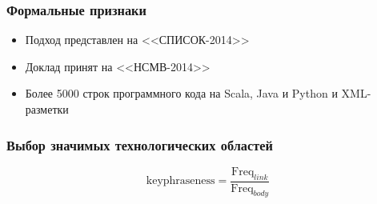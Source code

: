 \documentclass{beamer}
\begin{document}
\begin{frame}\frametitle{Формальные признаки}
\begin{itemize}
    \item Подход представлен на <<СПИСОК-2014>>
    \item Доклад принят на <<НСМВ-2014>>
    \item Более 5000 строк программного кода на Scala, Java и Python и XML-разметки
\end{itemize}
\end{frame}


{
\frame{\titlepage\label{lastframe}}
}

{

\begin{frame}\frametitle{Выбор значимых технологических областей}
$$\textrm{keyphraseness}=\frac{\textrm{Freq}_{link}}{\textrm{Freq}_{body}}$$
\end{frame}
}
\end{document}
